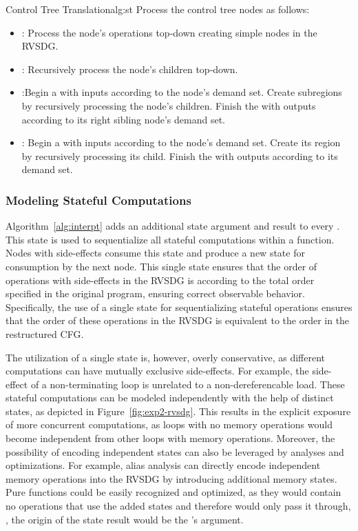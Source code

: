 \begin{informalg}{Control Tree Translation}{alg:st}
Process the control tree nodes as follows:
\begin{itemize}
	\item {}: Process the node's operations top-down creating simple nodes in the
		RVSDG.

	\item {}: Recursively process the node's children top-down.

	\item {}:Begin a \gammanode with inputs according to the node's demand set.
		Create subregions by recursively processing the node's children. Finish the \gammanode with
		outputs according to its right sibling node's demand set.

	\item {}: Begin a \thetanode with inputs according to the node's demand set.
		Create its region by recursively processing its child. Finish the \thetanode with outputs
		according to its demand set.

	\vspace*{-\baselineskip}
\end{itemize}
\end{informalg}

\subsubsection{Modeling Stateful Computations}\label{sec:modeling-state}
Algorithm~\ref{alg:interpt} adds an additional state argument and result to every \lambdanode. This
state is used to sequentialize all stateful computations within a function. Nodes
with side-effects consume this state and produce a new state for consumption by the next node. This
single state ensures that the order of operations with side-effects in the RVSDG is according to
the total order specified in the original program, ensuring correct observable behavior.
Specifically, the use of a single state for sequentializing stateful operations ensures that the
order of these operations in the RVSDG is equivalent to the order in the restructured CFG.

The utilization of a single state is, however, overly
conservative, as different computations can have mutually exclusive side-effects. For example, the
side-effect of a non-terminating loop is unrelated to a non-dereferencable load. These stateful
computations can be modeled independently with the help of distinct states, as depicted in
Figure~\ref{fig:exp2-rvsdg}. This results in the explicit exposure of more concurrent computations,
as loops with no memory operations would become independent from other loops with memory
operations. Moreover, the possibility of encoding independent states can also be leveraged by
analyses and optimizations. For example, alias analysis can directly encode independent memory
operations into the RVSDG by introducing additional memory states. Pure functions could
be easily recognized and optimized, as they would contain no operations that use the added states
and therefore would only pass it through, \ie, the origin of the state result would be the
\lambdaregion's argument.


